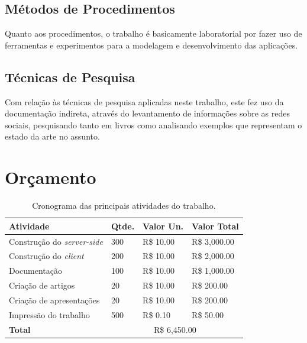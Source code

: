 \documentclass[diss]{template/setrem}
\begin{document}
\subsection{Métodos de Procedimentos}
Quanto aos procedimentos, o trabalho é basicamente laboratorial por fazer uso de ferramentas e experimentos para a modelagem e desenvolvimento das aplicações.

\subsection{Técnicas de Pesquisa}
Com relação às técnicas de pesquisa aplicadas neste trabalho, este fez uso da documentação indireta, através do levantamento de informações sobre as redes sociais, pesquisando tanto em livros como analisando exemplos que representam o estado da arte no assunto.

\section{Orçamento}
\begin{table}[!h]
  \begin{center}
  	\footnotesize
  	\renewcommand{\arraystretch}{1.5}
    \begin{tabular}{ | l | l | l | l |}
    \hline
	
	\textbf{Atividade} & \textbf{Qtde.} & \textbf{Valor Un.} & \textbf{Valor Total} \\ \hline
	Construção do \emph{server-side} & 300 & R\$ 10.00 & R\$ 3,000.00 \\ \hline
	Construção do \emph{client} & 200 & R\$ 10.00 & R\$ 2,000.00 \\ \hline
	Documentação & 100 & R\$ 10.00 & R\$ 1,000.00 \\ \hline
	Criação de artigos & 20 & R\$ 10.00 & R\$ 200.00 \\ \hline
	Criação de apresentações & 20 & R\$ 10.00 & R\$ 200.00 \\ \hline
	Impressão do trabalho & 500 & R\$ 0.10 & R\$ 50.00 \\ \hline
	\cellcolor[gray]{0.8} \textbf{Total} & \multicolumn{3}{|c|}{\cellcolor[gray]{0.8}R\$ 6,450.00}\\ \hline
	
    \hline
    \end{tabular}
  \end{center}
  \caption{Cronograma das principais atividades do trabalho.}
  \label{tab:patterns}
\end{table}
\end{document}
